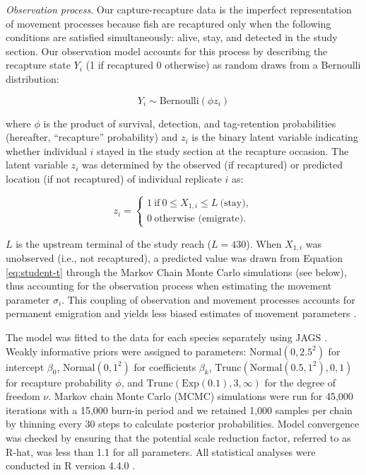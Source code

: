 \documentclass[11pt, class=article, crop=false]{standalone}
\begin{document}
\textit{Observation process}. Our capture-recapture data is the imperfect representation of movement processes because fish are recaptured only when the following conditions are satisfied simultaneously: alive, stay, and detected in the study section. Our observation model accounts for this process by describing the recapture state $Y_i$ (1 if recaptured 0 otherwise) as random draws from a Bernoulli distribution:

\begin{equation}
    Y_i \sim \text{Bernoulli}(\phi z_i)
\end{equation}

where $\phi$ is the product of survival, detection, and tag-retention probabilities (hereafter, ``recapture'' probability) and $z_i$ is the binary latent variable indicating whether individual $i$ stayed in the study section at the recapture occasion.
The latent variable $z_i$ was determined by the observed (if recaptured) or predicted location (if not recaptured) of individual replicate $i$ as: 

\begin{equation}
    z_i =
    \begin{cases}
        1~\text{if}~0 \le X_{1,i} \le L~\text{(stay)},\\
        0~\text{otherwise (emigrate)}.
    \end{cases}
\end{equation}

$L$ is the upstream terminal of the study reach ($L = 430$). When $X_{1,i}$ was unobserved (i.e., not recaptured), a predicted value was drawn from Equation \ref{eq:student-t} through the Markov Chain Monte Carlo simulations (see below), thus accounting for the observation process when estimating the movement parameter $\sigma_i$.
This coupling of observation and movement processes accounts for permanent emigration and yields less biased estimates of movement parameters \citep{teruiModelingDispersalUsing2020}.

The model was fitted to the data for each species separately using JAGS \citep{plummerJAGSProgramAnalysis2003}. Weakly informative priors were assigned to parameters: $\text{Normal}(0, 2.5^2)$ for intercept $\beta_0$, $\text{Normal}(0, 1^2)$ for coefficients $\beta_k$, $\text{Trunc}(\text{Normal}(0.5, 1^2), 0, 1)$ for recapture probability $\phi$, and $\text{Trunc}(\text{Exp}(0.1), 3, \infty)$ for the degree of freedom $\nu$. Markov chain Monte Carlo (MCMC) simulations were run for 45,000 iterations with a 15,000 burn-in period and we retained 1,000 samples per chain by thinning every 30 steps to calculate posterior probabilities. Model convergence was checked by ensuring that the potential scale reduction factor, referred to as R-hat, was less than 1.1 for all parameters. All statistical analyses were conducted in R version 4.4.0 \citep{rcoreteamLanguageEnvironmentStatistical2021}.
\end{document}
